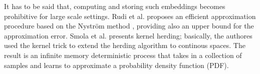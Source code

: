 It has to be said that, computing and storing such embeddings becomes prohibitive for large scale settings. Rudi et al. \cite{2022nystrom} proposes an efficient approximation procedure based on the Nyström method \cite{nystrom}, providing also an upper bound for the approximation error.
Smola et al. \cite{supersamples} presents kernel herding; basically, the authores used the kernel trick to extend the herding algorithm to continous spaces. The result is an infinite memory deterministic process that takes in a collection of samples and learns to approximate a probability density function (PDF).
\\
